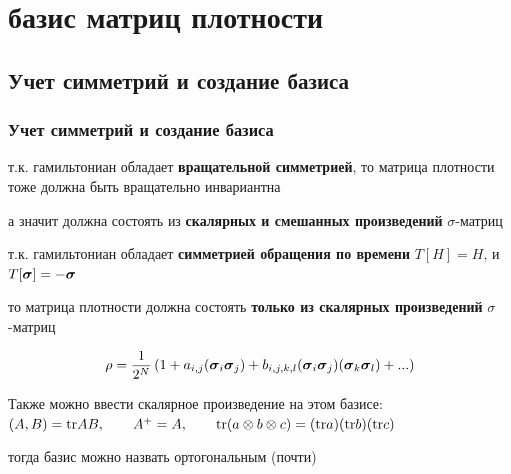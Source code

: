 \documentclass{beamer}
\begin{document}
\section{базис матриц плотности}
\subsection{Учет симметрий и создание базиса}
\begin{frame}
\frametitle{Учет симметрий и создание базиса}
т.к. гамильтониан обладает \textbf{ вращательной симметрией}, то матрица плотности тоже должна быть вращательно инвариантна

а значит должна состоять из \textbf{ скалярных и смешанных произведений} $\sigma$-матриц

т.к. гамильтониан обладает \textbf{симметрией обращения по времени} $T[H]=H$, и $T[{\boldsymbol{\sigma}}]=-{\boldsymbol{\sigma}}$

то матрица плотности должна состоять \textbf{только из скалярных произведений} $\sigma$-матриц

$$\rho=\frac{1}{2^N}\left(1+a_{i,j}({\boldsymbol{\sigma}}_i {\boldsymbol{\sigma}}_j)+b_{i,j,k,l}({\boldsymbol{\sigma}}_i {\boldsymbol{\sigma}}_j)({\boldsymbol{\sigma}}_k {\boldsymbol{\sigma}}_l)+...\right)$$

Также можно ввести скалярное произведение на этом базисе: $(A,B)=\mathrm{tr} A B, \qquad A^+=A, \qquad \mathrm{tr}( a\otimes b \otimes c) = (\mathrm{tr} a)(\mathrm{tr} b)(\mathrm{tr} c)$

тогда базис можно назвать ортогональным (почти)
\end{frame}

\end{document}

